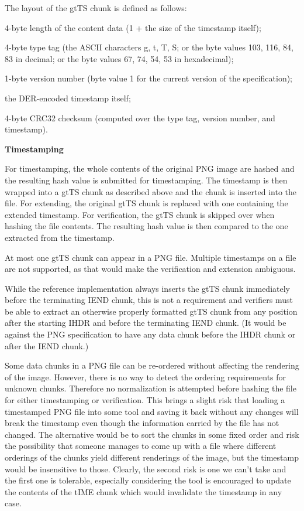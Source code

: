 The layout of the {\ttfamily gtTS} chunk is defined as follows:
\begin{DoxyItemize}
\item 4-\/byte length of the content data (1 + the size of the timestamp itself);
\item 4-\/byte type tag (the ASCII characters {\ttfamily g}, {\ttfamily t}, {\ttfamily T}, {\ttfamily S}; or the byte values 103, 116, 84, 83 in decimal; or the byte values 67, 74, 54, 53 in hexadecimal);
\item 1-\/byte version number (byte value 1 for the current version of the specification);
\item the DER-\/encoded timestamp itself;
\item 4-\/byte CRC32 checksum (computed over the type tag, version number, and timestamp).
\end{DoxyItemize}

{\bfseries Timestamping}

For timestamping, the whole contents of the original PNG image are hashed and the resulting hash value is submitted for timestamping. The timestamp is then wrapped into a {\ttfamily gtTS} chunk as described above and the chunk is inserted into the file. For extending, the original {\ttfamily gtTS} chunk is replaced with one containing the extended timestamp. For verification, the {\ttfamily gtTS} chunk is skipped over when hashing the file contents. The resulting hash value is then compared to the one extracted from the timestamp.

At most one {\ttfamily gtTS} chunk can appear in a PNG file. Multiple timestamps on a file are not supported, as that would make the verification and extension ambiguous.

While the reference implementation always inserts the {\ttfamily gtTS} chunk immediately before the terminating {\ttfamily IEND} chunk, this is not a requirement and verifiers must be able to extract an otherwise properly formatted {\ttfamily gtTS} chunk from any position after the starting {\ttfamily IHDR} and before the terminating {\ttfamily IEND} chunk. (It would be against the PNG specification to have any data chunk before the {\ttfamily IHDR} chunk or after the {\ttfamily IEND} chunk.)

Some data chunks in a PNG file can be re-\/ordered without affecting the rendering of the image. However, there is no way to detect the ordering requirements for unknown chunks. Therefore no normalization is attempted before hashing the file for either timestamping or verification. This brings a slight risk that loading a timestamped PNG file into some tool and saving it back without any changes will break the timestamp even though the information carried by the file has not changed. The alternative would be to sort the chunks in some fixed order and risk the possibility that someone manages to come up with a file where different orderings of the chunks yield different renderings of the image, but the timestamp would be insensitive to those. Clearly, the second risk is one we can't take and the first one is tolerable, especially considering the tool is encouraged to update the contents of the {\ttfamily tIME} chunk which would invalidate the timestamp in any case. 

